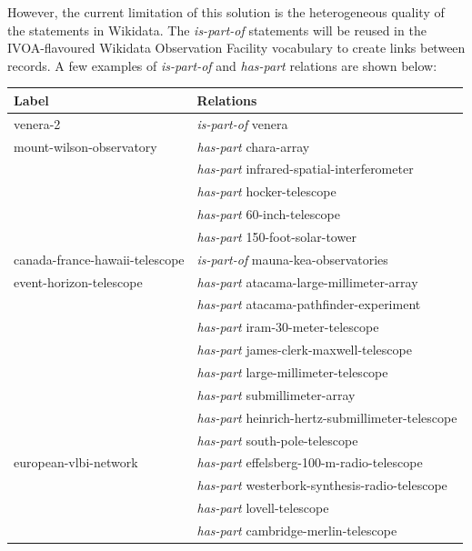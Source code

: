 \documentclass[11pt,a4paper]{ivoa}
\begin{document}
However, the current limitation of this solution is the heterogeneous 
quality of the statements in Wikidata. The \emph{is-part-of} 
statements will be reused in the IVOA-flavoured Wikidata Observation 
Facility vocabulary to create links between records. A few examples of 
\emph{is-part-of} and \emph{has-part} relations are shown below:
{\small \noindent\begin{longtable}{p{}p{}}
\textbf{Label} & \textbf{Relations}\\
\hline
\hline
venera-2  & \emph{is-part-of} venera\\
\hline
mount-wilson-observatory & \emph{has-part} chara-array\\
                         & \emph{has-part} infrared-spatial-interferometer\\
                         & \emph{has-part} hocker-telescope\\
                         & \emph{has-part} 60-inch-telescope\\
                         & \emph{has-part} 150-foot-solar-tower\\
\hline
canada-france-hawaii-telescope & \emph{is-part-of} mauna-kea-observatories\\
\hline
event-horizon-telescope & \emph{has-part} atacama-large-millimeter-array\\
                        & \emph{has-part} atacama-pathfinder-experiment\\
                        & \emph{has-part} iram-30-meter-telescope\\
                        & \emph{has-part} james-clerk-maxwell-telescope\\
                        & \emph{has-part} large-millimeter-telescope\\
                        & \emph{has-part} submillimeter-array\\
                        & \emph{has-part} heinrich-hertz-submillimeter-telescope\\
                        & \emph{has-part} south-pole-telescope\\
\hline
european-vlbi-network   & \emph{has-part} effelsberg-100-m-radio-telescope\\
                        & \emph{has-part} westerbork-synthesis-radio-telescope\\
                        & \emph{has-part} lovell-telescope\\
                        & \emph{has-part} cambridge-merlin-telescope\\

\end{longtable}}
\end{document}
